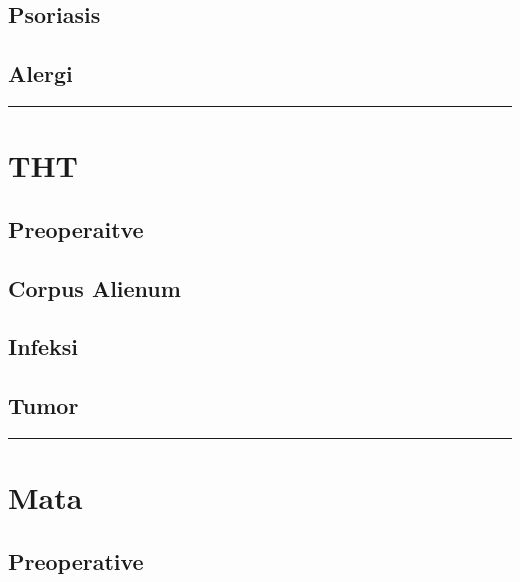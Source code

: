 \documentclass[
]{book}
\begin{document}
\hypertarget{psoriasis}{%
\subsection{Psoriasis}\label{psoriasis}}

\hypertarget{alergi}{%
\subsection{Alergi}\label{alergi}}

\begin{center}\rule{0.5\linewidth}{0.5pt}\end{center}

\hypertarget{tht}{%
\section{THT}\label{tht}}

\hypertarget{preoperaitve}{%
\subsection{Preoperaitve}\label{preoperaitve}}

\hypertarget{corpus-alienum}{%
\subsection{Corpus Alienum}\label{corpus-alienum}}

\hypertarget{infeksi-4}{%
\subsection{Infeksi}\label{infeksi-4}}

\hypertarget{tumor}{%
\subsection{Tumor}\label{tumor}}

\begin{center}\rule{0.5\linewidth}{0.5pt}\end{center}

\hypertarget{mata}{%
\section{Mata}\label{mata}}

\hypertarget{preoperative-2}{%
\subsection{Preoperative}\label{preoperative-2}}
\end{document}
